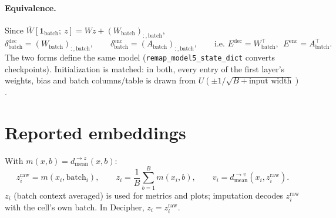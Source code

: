 \documentclass{article}
\newcommand{\batch}{\mathrm{batch}}
\newcommand{\dec}{\mathrm{dec}}
\newcommand{\enc}{\mathrm{enc}}
\newcommand{\one}{\mathbf{1}}
\begin{document}
\paragraph{Equivalence.} Since $\bar W [\one_{\batch};\ z] = W z + (W_{\batch})_{:,\batch}$,
\[
\delta^{\dec}_{\batch} = (W_{\batch})_{:,\batch}, \qquad
\delta^{\enc}_{\batch} = (A_{\batch})_{:,\batch}, \qquad
\text{i.e. } E^{\dec} = W_{\batch}^{\top},\ \ E^{\enc} = A_{\batch}^{\top}.
\]
The two forms define the same model (\texttt{remap\_model5\_state\_dict} converts
checkpoints). Initialization is matched: in both, every entry of the first layer's weights,
bias and batch columns/table is drawn from $U(\pm 1/\sqrt{B + \text{input width}})$.

\section{Reported embeddings}

With $m(x, b) = d^{\to z}_{\mathrm{mean}}(x, b)$:
\[
z^{\mathrm{raw}}_i = m(x_i, \batch_i), \qquad
z_i = \frac{1}{B} \sum_{b=1}^{B} m(x_i, b), \qquad
v_i = d^{\to v}_{\mathrm{mean}}(x_i, z^{\mathrm{raw}}_i).
\]
$z_i$ (batch context averaged) is used for metrics and plots; imputation decodes
$z^{\mathrm{raw}}_i$ with the cell's own batch. In Decipher, $z_i = z^{\mathrm{raw}}_i$.
\end{document}
